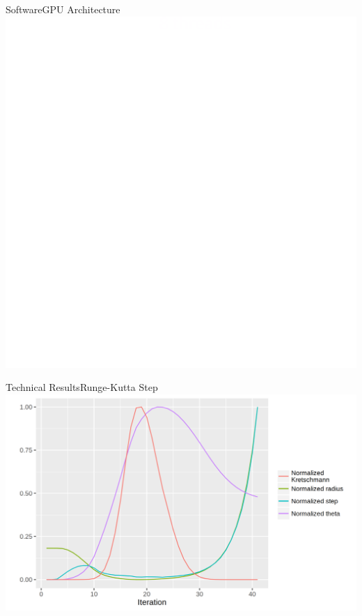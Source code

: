 \begin{frame}{Software}{GPU Architecture}
\centering
\includegraphics[height=0.7\paperheight]{gfx/owncudagrid}
\end{frame}



\begin{frame}{Technical Results}{Runge-Kutta Step}
	\centering
	\includegraphics[width=0.7\paperwidth]{gfx/kretschmann}
\end{frame}

